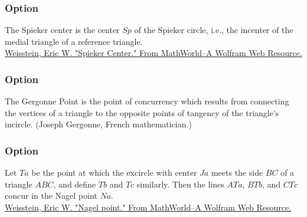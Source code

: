 \subsubsection{Option }
The Spieker center is the center $Sp$ of the Spieker circle, i.e., the incenter of the medial triangle of a reference triangle.\\
\href{https://mathworld.wolfram.com/SpiekerCenter.html}{Weisstein, Eric W. "Spieker Center." From MathWorld--A Wolfram Web Resource. }

\begin{tkzexample}[latex=8cm,small]
\end{tkzexample}

\subsubsection{Option }

The Gergonne Point is the point of concurrency which results from connecting the vertices of a triangle to the opposite points of tangency of the triangle's incircle.
(Joseph Gergonne, French mathematician.)

\begin{tkzexample}[latex=8cm,small]
\end{tkzexample}

\subsubsection{Option }
Let $Ta$ be the point at which the excircle with center $Ja$ meets the side $BC$ of a triangle $ABC$, and define $Tb$ and $Tc$ similarly. Then the lines $ATa$, $BTb$, and $CTc$ concur in the Nagel point $Na$.\\
\href{https://mathworld.wolfram.com/NagelPoint.html}{Weisstein, Eric W. "Nagel point." From MathWorld--A Wolfram Web Resource. }


